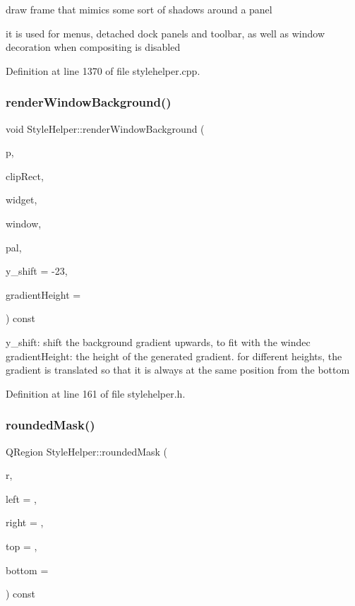 draw frame that mimics some sort of shadows around a panel 

it is used for menus, detached dock panels and toolbar, as well as window decoration when compositing is disabled 

Definition at line 1370 of file stylehelper.\+cpp.

\mbox{\label{class_style_helper_abcce38b9da53408df8d2e8672ec2d84a}} 
\subsubsection{\texorpdfstring{render\+Window\+Background()}{renderWindowBackground()}}
{\footnotesize\ttfamily void Style\+Helper\+::render\+Window\+Background (\begin{DoxyParamCaption}\item[{Q\+Painter $\ast$}]{p,  }\item[{const Q\+Rect \&}]{clip\+Rect,  }\item[{const Q\+Widget $\ast$}]{widget,  }\item[{const Q\+Widget $\ast$}]{window,  }\item[{const Q\+Palette \&}]{pal,  }\item[{int}]{y\+\_\+shift = {\ttfamily -\/23},  }\item[{int}]{gradient\+Height = {} }\end{DoxyParamCaption}) const\hspace{0.3cm}{\ttfamily [inline]}}

y\+\_\+shift\+: shift the background gradient upwards, to fit with the windec gradient\+Height\+: the height of the generated gradient. for different heights, the gradient is translated so that it is always at the same position from the bottom 

Definition at line 161 of file stylehelper.\+h.

\mbox{\label{class_style_helper_a51cd489128487ccbf65126f87176d3f4}} 
\subsubsection{\texorpdfstring{rounded\+Mask()}{roundedMask()}}
{\footnotesize\ttfamily Q\+Region Style\+Helper\+::rounded\+Mask (\begin{DoxyParamCaption}\item[{const Q\+Rect \&}]{r,  }\item[{int}]{left = {},  }\item[{int}]{right = {},  }\item[{int}]{top = {},  }\item[{int}]{bottom = {} }\end{DoxyParamCaption}) const}




